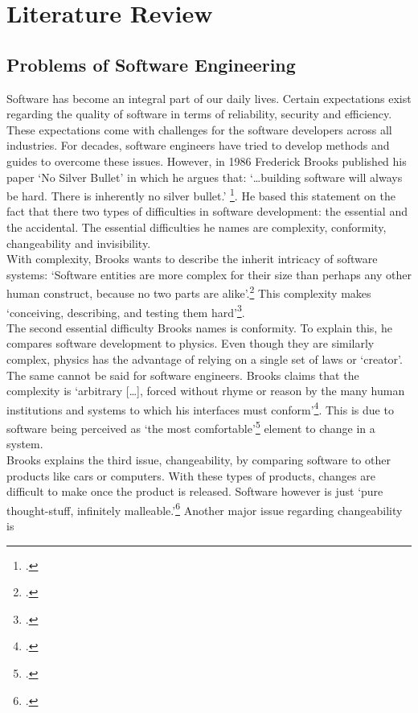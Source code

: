 \section{Literature Review}
\subsection{Problems of Software Engineering}
Software has become an integral part of our daily lives. Certain expectations exist regarding the quality of software in terms of reliability, security and efficiency. These expectations come with challenges for the software developers across all industries.
For decades, software engineers have tried to develop methods and guides to overcome these issues. However, in 1986 Frederick Brooks published his paper `No Silver Bullet'
in which he argues that: `\ldots building software will always be hard. There is inherently no silver bullet.' \footcite[3]{brooksNoSilverBullet1987}. He based this statement on the fact that there two types of difficulties in software development: the essential and the accidental.
The essential difficulties he names are complexity, conformity, changeability and invisibility.\\
With complexity, Brooks wants to describe the inherit intricacy of software systems: `Software entities are more complex for their size than perhaps any other human construct, because no two parts are alike'.\footcite[3]{brooksNoSilverBullet1987}
This complexity makes `conceiving, describing, and testing them hard'\footcite[3]{brooksNoSilverBullet1987}.\\
The second essential difficulty Brooks names is conformity. To explain this, he compares software development to physics. Even though they are similarly complex, physics has the advantage of relying on a single set of laws or `creator'. The same cannot be said for software engineers. Brooks claims that
the complexity is `arbitrary [\ldots], forced without rhyme or reason by the many human institutions and systems to which his interfaces must conform'\footcite[4]{brooksNoSilverBullet1987}. This is due to software being perceived as `the most comfortable'\footcite[4]{brooksNoSilverBullet1987} element to change in a system.\\
Brooks explains the third issue, changeability, by comparing software to other products like cars or computers. With these types of products, changes are difficult to make once the product is released. Software however is just `pure thought-stuff, infinitely malleable.'\footcite[4]{brooksNoSilverBullet1987} Another major issue regarding changeability is
